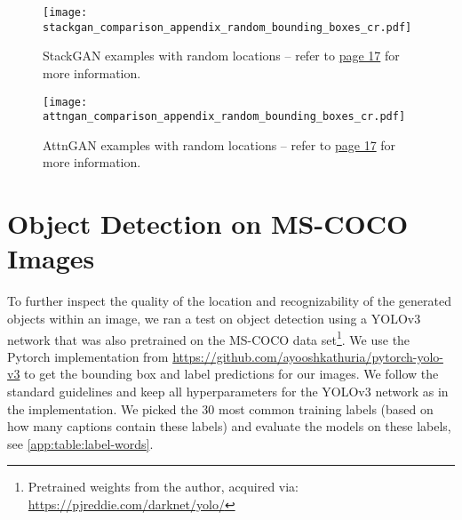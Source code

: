 \documentclass{article} \usepackage{iclr2019_conference,times}
\begin{document}
	\newpage
	\begin{figure}[t]
		\centering
		\texttt{[image: stackgan\_comparison\_appendix\_random\_bounding\_boxes\_cr.pdf]}
		\caption{StackGAN examples with random locations -- refer to \hyperref[app:fig:mscoco:stackgan]{page 17} for more information.}
		\label{fig:coco:stackgan:appendix:random}
		\vspace{-0.75em}
	\end{figure}
	
	\begin{figure}[h]
		\centering
		\texttt{[image: attngan\_comparison\_appendix\_random\_bounding\_boxes\_cr.pdf]}
		\caption{AttnGAN examples with random locations -- refer to \hyperref[app:fig:mscoco:attngan]{page 17} for more information.}
		\label{fig:coco:attngan:appendix:random}
		\vspace{-0.75em}
	\end{figure}	
	\fi

\clearpage
\section{Object Detection on MS-COCO Images}
\label{app:bbox:mscoco:yolo}
\renewcommand{\topfraction}{0.9} 		\renewcommand{\bottomfraction}{0.5}		\renewcommand{\textfraction}{0.1}		\renewcommand{\floatpagefraction}{0.8} 	To further inspect the quality of the location and recognizability of the generated objects within an image, we ran a test on object detection using a YOLOv3 network \cite{redmon2018yolov3} that was also pretrained on the MS-COCO data set\footnote{Pretrained weights from the author, acquired via: \url{https://pjreddie.com/darknet/yolo/}}.
	We use the Pytorch implementation from \url{https://github.com/ayooshkathuria/pytorch-yolo-v3} to get the bounding box and label predictions for our images.
	We follow the standard guidelines and keep all hyperparameters for the YOLOv3 network as in the implementation.
	We picked the 30 most common training labels (based on how many captions contain these labels) and evaluate the models on these labels, see \autoref{app:table:label-words}.
	
\end{document}
